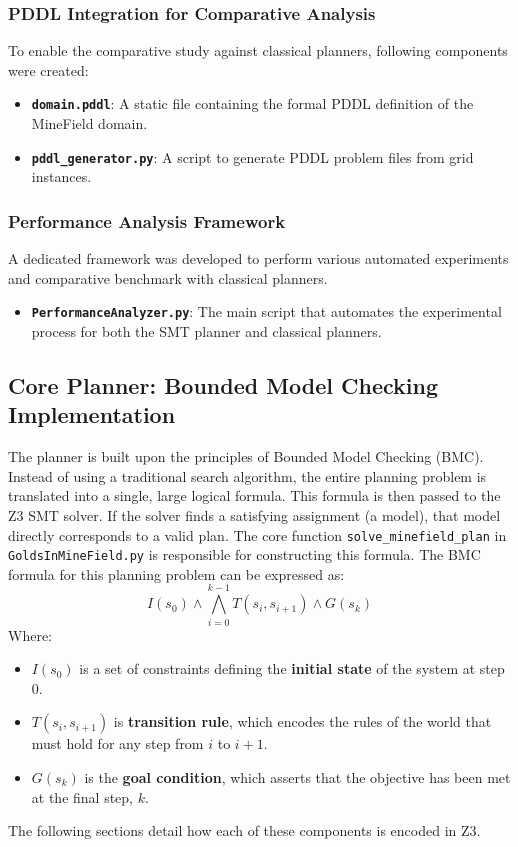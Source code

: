 \documentclass[12pt, a4paper, oneside]{report} %
\begin{document}
\subsubsection{PDDL Integration for Comparative Analysis}
To enable the comparative study against classical planners, following components were created:
\begin{itemize}
    \item \textbf{\texttt{domain.pddl}}: A static file containing the formal PDDL definition of the MineField domain.
    \item \textbf{\texttt{pddl\_generator.py}}: A script to generate PDDL problem files from grid instances.
\end{itemize}

\subsubsection{Performance Analysis Framework}
A dedicated framework was developed to perform various automated experiments and comparative benchmark with classical planners.
\begin{itemize}
    \item \textbf{\texttt{PerformanceAnalyzer.py}}: The main script that automates the experimental process for both the SMT planner and classical planners.
\end{itemize}



\subsection{Core Planner: Bounded Model Checking Implementation}
\label{sec:bmc_implementation}
The planner is built upon the principles of Bounded Model Checking (BMC). Instead of using a traditional search algorithm, the entire planning problem is translated into a single, large logical formula. This formula is then passed to the Z3 SMT solver. If the solver finds a satisfying assignment (a model), that model directly corresponds to a valid plan.
The core function \texttt{solve\_minefield\_plan} in \texttt{GoldsInMineField.py} is responsible for constructing this formula. The BMC formula for this planning problem can be expressed as:
\[
I(s_0) \land \bigwedge_{i=0}^{k-1} T(s_i, s_{i+1}) \land G(s_k)
\]
Where:
\begin{itemize}
    \item $I(s_0)$ is a set of constraints defining the \textbf{initial state} of the system at step 0.
    \item $T(s_i, s_{i+1})$ is \textbf{transition rule}, which encodes the rules of the world that must hold for any step from $i$ to $i+1$.
    \item $G(s_k)$ is the \textbf{goal condition}, which asserts that the objective has been met at the final step, $k$.
\end{itemize}
The following sections detail how each of these components is encoded in Z3.
\end{document}
